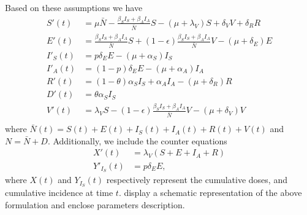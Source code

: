     Based on these assumptions we have
\begin{equation}\label{model1}
    \begin{aligned}
        S'(t)&=\mu \bar{N}-\frac{\beta_S
        I_S+\beta_AI_A}{\bar{N}}S-(\mu+\lambda_V)S
         +\delta_V V+ \delta_R R\\
        E'(t)&= \frac{\beta_S
        I_S+\beta_AI_A}{\bar{N}}S+(1-\epsilon)
         \frac{\beta_S
        I_S+\beta_AI_A}{\bar{N}}V-(\mu+\delta_E)
         E \\
        I'_S(t)&= p \delta_E E-(\mu+\alpha_S)
        I_S\\
        I'_A(t)&= (1-p) \delta_E
        E-(\mu+\alpha_A) I_A \\
        R'(t)&= (1-\theta) \alpha_S
        I_S+\alpha_A I_A-(\mu+\delta_R) R \\
        D'(t)&= \theta \alpha_S I_S \\
        V'(t)&= \lambda_V S-(1-\epsilon)
        \frac{\beta_S
        I_S+\beta_AI_A}{\bar{N}}V-(\mu+\delta_V)
         V\\
    \end{aligned}
\end{equation}
where
$\bar{N}(t)=S(t)+E(t)+I_S(t)+I_A(t)+R(t)+V(t)$
and $N=\bar{N}+D$. Additionally, we include the counter equations
\begin{equation}
    \label{eqn:model1_counters}
    \begin{aligned}
        X'(t) &=
        \lambda_V(S + E + I_A + R)
        \\
        Y'_{I_S}(t) &=p
        \delta_E E,
    \end{aligned}
\end{equation}
where $X(t)$ and $Y_{I_S}(t)$ respectively represent the cumulative
doses, and
cumulative incidence at time $t$. 
display a schematic representation of the above formulation and
 enclose parameters description.
%
